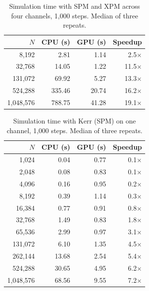 \begin{table}[H]
  \centering
  \caption{Simulation time with SPM and XPM across four channels, 1,000 steps. Median of three repeats.}
  \begin{tabular}{rrrr}
    \toprule
    $N$ & CPU (s) & GPU (s) & Speedup \\
    \midrule
    8,192 & 2.81 & 1.14 & 2.5$\times$ \\
    32,768 & 14.05 & 1.22 & 11.5$\times$ \\
    131,072 & 69.92 & 5.27 & 13.3$\times$ \\
    524,288 & 335.46 & 20.74 & 16.2$\times$ \\
    1,048,576 & 788.75 & 41.28 & 19.1$\times$ \\
    \bottomrule
  \end{tabular}
\end{table}

\begin{table}[H]
  \centering
  \caption{Simulation time with Kerr (SPM) on one channel, 1,000 steps. Median of three repeats.}
  \begin{tabular}{rrrr}
    \toprule
    $N$ & CPU (s) & GPU (s) & Speedup \\
    \midrule
    1,024 & 0.04 & 0.77 & 0.1$\times$ \\
    2,048 & 0.08 & 0.83 & 0.1$\times$ \\
    4,096 & 0.16 & 0.95 & 0.2$\times$ \\
    8,192 & 0.39 & 1.14 & 0.3$\times$ \\
    16,384 & 0.77 & 0.91 & 0.8$\times$ \\
    32,768 & 1.49 & 0.83 & 1.8$\times$ \\
    65,536 & 2.99 & 0.97 & 3.1$\times$ \\
    131,072 & 6.10 & 1.35 & 4.5$\times$ \\
    262,144 & 13.68 & 2.54 & 5.4$\times$ \\
    524,288 & 30.65 & 4.95 & 6.2$\times$ \\
    1,048,576 & 68.56 & 9.55 & 7.2$\times$ \\
    \bottomrule
  \end{tabular}
\end{table}
